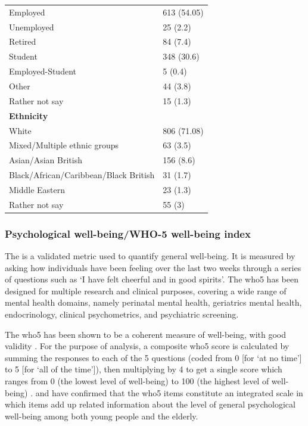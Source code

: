 \begin{table}[!ht]
\begin{tabular}{@{}ll@{}}
    \quad Employed                              & 613 (54.05)             \\
    \quad Unemployed                            & 25  (2.2)               \\
    \quad Retired                               & 84  (7.4)               \\
    \quad Student                               & 348 (30.6)              \\
    \quad Employed-Student                      & 5   (0.4)               \\
    \quad Other                                 & 44  (3.8)               \\
    \quad Rather not say                        & 15  (1.3)               \\
    \textbf{Ethnicity}                          &                         \\
    \quad White                                 & 806 (71.08)             \\
    \quad Mixed/Multiple ethnic groups          & 63  (3.5)               \\
    \quad Asian/Asian British                   & 156 (8.6)               \\
    \quad Black/African/Caribbean/Black British & 31  (1.7)               \\
    \quad Middle Eastern                        & 23  (1.3)               \\
    \quad Rather not say                        & 55  (3)                 \\
    \bottomrule
  \end{tabular}%
\end{table}

\subsubsection*{Psychological well-being/WHO-5 well-being index}
The  is a validated metric used to quantify general well-being. It is measured by asking how individuals have been feeling over the last two weeks through a series of questions such as `I have felt cheerful and in good spirits'. The \gls{who5} has been designed for multiple research and clinical purposes, covering a wide range of mental health domains, namely perinatal mental health, geriatrics mental health, endocrinology, clinical psychometrics, and psychiatric screening.

The \gls{who5} has been shown to be a coherent measure of well-being, with good validity \citep{Topp2015WHO}. For the purpose of analysis, a composite \gls{who5} score is calculated by summing the responses to each of the 5 questions (coded from 0 [for `at no time'] to 5 [for `all of the time']), then multiplying by 4 to get a single score which ranges from 0 (the lowest level of well-being) to 100 (the highest level of well-being) \citep{Topp2015WHO}. \citet{Blom2012Screening} and \citet{LucasCarrasco2012Validity} have confirmed that the \gls{who5} items constitute an integrated scale in which items add up related information about the level of general psychological well-being among both young people and the elderly. 


